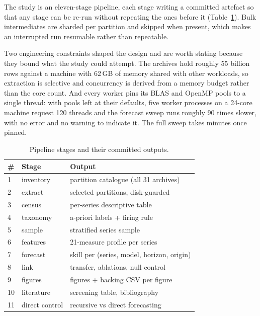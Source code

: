 \documentclass[11pt,a4paper]{article}
\newcommand{\num}[1]{#1}
\begin{document}
The study is an eleven-stage pipeline, each stage writing a committed artefact so
that any stage can be re-run without repeating the ones before it
(Table~\ref{tab:pipeline}). Bulk intermediates are sharded per partition and
skipped when present, which makes an interrupted run resumable rather than
repeatable.

Two engineering constraints shaped the design and are worth stating because they
bound what the study could attempt. The archives hold roughly \num{55} billion
rows against a machine with \num{62}\,GB of memory shared with other workloads,
so extraction is selective and concurrency is derived from a memory budget rather
than the core count. And every worker pins its BLAS and OpenMP pools to a single
thread: with pools left at their defaults, five worker processes on a 24-core
machine request 120 threads and the forecast sweep runs roughly \num{90} times
slower, with no error and no warning to indicate it. The full sweep takes minutes
once pinned.

\begin{table}[t]
\centering
\caption{Pipeline stages and their committed outputs.}
\label{tab:pipeline}
\small
\begin{tabular}{llp{2.9cm}}
\toprule
\# & Stage & Output \\
\midrule
1 & inventory & partition catalogue (all 31 archives) \\
2 & extract & selected partitions, disk-guarded \\
3 & census & per-series descriptive table \\
4 & taxonomy & a-priori labels + firing rule \\
5 & sample & stratified series sample \\
6 & features & \num{21}-measure profile per series \\
7 & forecast & skill per (series, model, horizon, origin) \\
8 & link & transfer, ablations, null control \\
9 & figures & figures + backing CSV per figure \\
10 & literature & screening table, bibliography \\
11 & direct control & recursive vs direct forecasting \\
\bottomrule
\end{tabular}
\end{table}
\end{document}

